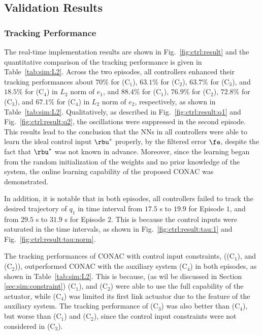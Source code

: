 \documentclass[lettersize,journal]{IEEEtran}
\begin{document}
\subsection{Validation Results}

\subsubsection{Tracking Performance}

The real-time implementation results are shown in Fig.~\ref{fig:ctrl:result} and the quantitative comparison of the tracking performance is given in Table~\ref{tab:sim:L2}.
Across the two episodes, all controllers enhanced their tracking performances about $70 \%$ for (C$_1$), $63.1 \%$ for (C$_2$), $63.7 \%$ for (C$_3$), and $18.5 \%$ for (C$_4$) in $L_2$ norm of $e_1$, and $88.4 \%$ for (C$_1$), $76.9 \%$ for (C$_2$), $72.8 \%$ for (C$_3$), and $67.1 \%$ for (C$_4$) in $L_2$ norm of $e_2$, respectively, as shown in Table~\ref{tab:sim:L2}.
Qualitatively, as described in Fig.~\ref{fig:ctrl:result:q1} and Fig.~\ref{fig:ctrl:result:q2}, the oscillations were suppressed in the second episode.
This results lead to the conclusion that the NNs in all controllers were able to learn the ideal control input $\rbu^*$ properly, by the filtered error $\fe$, despite the fact that $\rbu^*$ was not known in advance.
Moreover, since the learning began from the random initialization of the weights and no prior knowledge of the system, the online learning capability of the proposed CONAC was demonstrated.

In addition, it is notable that in both episodes, all controllers failed to track the desired trajectory of $q_1$ in time interval from $17.5$ s to $19.9$ for Episode $1$, and from $29.5$ s to $31.9$ s for Episode $2$.
This is because the control inputs were saturated in the time intervals, as shown in Fig.~\ref{fig:ctrl:result:tau:1} and Fig.~\ref{fig:ctrl:result:tau:norm}.

The tracking performances of CONAC with control input constraints, (\ie (C$_1$), and (C$_2$)), outperformed CONAC with the auxiliary system (C$_4$) in both episodes, as shown in Table~\ref{tab:sim:L2}.
This is because, (as wil be discussed in Section \ref{sec:sim:constraint}) (C$_1$), and (C$_2$) were able to use the full capability of the actuator, while (C$_4$) was limited its first link actuator due to the feature of the auxiliary system.
The tracking performance of (C$_3$) was also better than (C$_4$), but worse than (C$_1$) and (C$_2$), since the control input constraints were not considered in (C$_3$).
\end{document}
